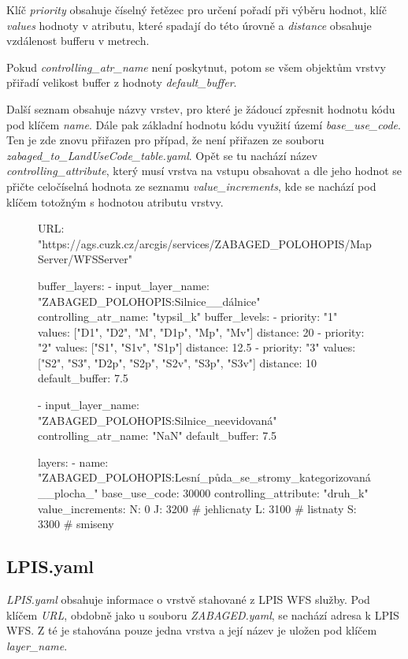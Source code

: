 \documentclass[a4paper,oneside,12pt]{book}
\begin{document}
\hspace{10mm}Klíč \textit{priority} obsahuje číselný řetězec pro určení pořadí při výběru hodnot, klíč \textit{values} hodnoty v atributu, které spadají do této úrovně a \textit{distance} obsahuje vzdálenost bufferu v metrech.

\hspace{10mm}Pokud \textit{controlling\_atr\_name} není poskytnut, potom se všem objektům vrstvy přiřadí velikost buffer z hodnoty \textit{default\_buffer}.

\hspace{10mm}Další seznam obsahuje názvy vrstev, pro které je žádoucí zpřesnit hodnotu kódu pod klíčem \textit{name}. Dále pak základní hodnotu kódu využití území \textit{base\_use\_code}. Ten je zde znovu přiřazen pro případ, že není přiřazen ze souboru  \newline \textit{zabaged\_to\_LandUseCode\_table.yaml}. Opět se tu nachází název \textit{controlling\_attribute}, který musí vrstva na vstupu obsahovat a dle jeho hodnot se přičte celočíselná hodnota ze seznamu \textit{value\_increments}, kde se nachází pod klíčem totožným s hodnotou atributu vrstvy. 

\begin{figure}[H]
\begin{pythoncode}[style=myyaml, caption={Ukázka ZABAGED.yaml},label={kod:ZABAGED.yaml}]
URL: "https://ags.cuzk.cz/arcgis/services/ZABAGED_POLOHOPIS/MapServer/WFSServer"

buffer_layers:
  - input_layer_name: "ZABAGED_POLOHOPIS:Silnice__dálnice"
    controlling_atr_name: "typsil_k"
    buffer_levels:
      - priority: "1"
        values: ["D1", "D2", "M", "D1p", "Mp", "Mv"]
        distance: 20
      - priority: "2"
        values: ["S1", "S1v", "S1p"]
        distance: 12.5
      - priority: "3"
        values: ["S2", "S3", "D2p", "S2p", "S2v", "S3p", "S3v"]
        distance: 10
    default_buffer: 7.5

  - input_layer_name: "ZABAGED_POLOHOPIS:Silnice_neevidovaná"
    controlling_atr_name: "NaN"
    default_buffer: 7.5

layers:
  - name: "ZABAGED_POLOHOPIS:Lesní_půda_se_stromy_kategorizovaná__plocha_"
    base_use_code: 30000
    controlling_attribute: "druh_k"
    value_increments:
      N: 0
      J: 3200 # jehlicnaty
      L: 3100 # listnaty
      S: 3300 # smiseny
\end{pythoncode}
\end{figure}

\subsection{LPIS.yaml} \label{LPIS.yaml}
\hspace{10mm} \textit{LPIS.yaml} obsahuje informace o vrstvě stahované z LPIS WFS služby. Pod klíčem \textit{URL}, obdobně jako u souboru \textit{ZABAGED.yaml}, se nachází adresa k LPIS WFS. Z té je stahována pouze jedna vrstva a její název je uložen pod klíčem \textit{layer\_name}.
\end{document}
